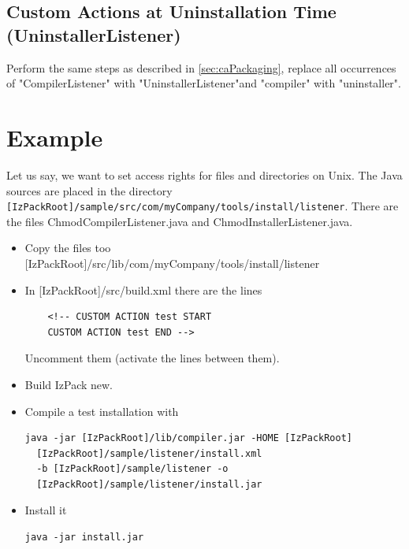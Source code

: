 \subsection{Custom Actions at Uninstallation Time
(UninstallerListener)} Perform the same steps as described in
\ref{sec:caPackaging}, replace all occurrences of
"CompilerListener" with "UninstallerListener"and "compiler" with
"uninstaller".

\section{Example}
Let us say, we want to set access rights for files and directories
on Unix. The Java sources are placed in the directory \\
\texttt{[IzPackRoot]/sample/src/com/myCompany/tools/install/listener}.
There are the files ChmodCompilerListener.java and
ChmodInstallerListener.java.
\begin{itemize}
  \item Copy the files too
  [IzPackRoot]/src/lib/com/myCompany/tools/install/listener
  \item In [IzPackRoot]/src/build.xml there are the lines
\footnotesize
\begin{verbatim}
    <!-- CUSTOM ACTION test START
    CUSTOM ACTION test END -->
\end{verbatim}
\normalsize Uncomment them (activate the lines between them).
  \item Build IzPack new.
  \item Compile a test installation with
\footnotesize
\begin{verbatim}
java -jar [IzPackRoot]/lib/compiler.jar -HOME [IzPackRoot]
  [IzPackRoot]/sample/listener/install.xml
  -b [IzPackRoot]/sample/listener -o
  [IzPackRoot]/sample/listener/install.jar
\end{verbatim}
\normalsize
  \item Install it
\footnotesize
\begin{verbatim}
java -jar install.jar
\end{verbatim}
\normalsize
\end{itemize}\
